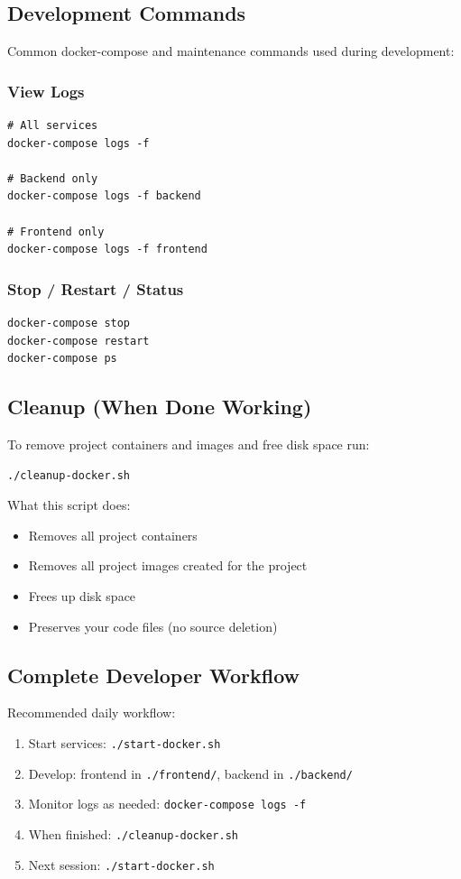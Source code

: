\documentclass[11pt]{article}
\begin{document}
\subsection{Development Commands}
Common docker-compose and maintenance commands used during development:
\subsubsection*{View Logs}
\begin{Verbatim}[fontsize=\small]
# All services
docker-compose logs -f

# Backend only
docker-compose logs -f backend

# Frontend only
docker-compose logs -f frontend
\end{Verbatim}

\subsubsection*{Stop / Restart / Status}
\begin{Verbatim}[fontsize=\small]
docker-compose stop
docker-compose restart
docker-compose ps
\end{Verbatim}

\subsection{Cleanup (When Done Working)}
To remove project containers and images and free disk space run:
\begin{Verbatim}[fontsize=\small]
./cleanup-docker.sh
\end{Verbatim}

What this script does:
\begin{itemize}
	\item Removes all project containers
	\item Removes all project images created for the project
	\item Frees up disk space
	\item Preserves your code files (no source deletion)
\end{itemize}

\subsection{Complete Developer Workflow}
Recommended daily workflow:
\begin{enumerate}
	\item Start services: \texttt{./start-docker.sh}
	\item Develop: frontend in \texttt{./frontend/}, backend in \texttt{./backend/}
	\item Monitor logs as needed: \texttt{docker-compose logs -f}
	\item When finished: \texttt{./cleanup-docker.sh}
	\item Next session: \texttt{./start-docker.sh}
\end{enumerate}
\end{document}
